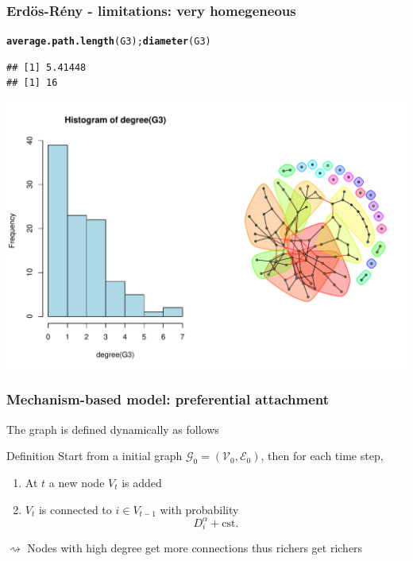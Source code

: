 \documentclass{beamer}\usepackage[]{graphicx}\usepackage[]{color}
\makeatletter
\newcommand{\hlstd}[1]{\textcolor[rgb]{0.345,0.345,0.345}{#1}}%
\newcommand{\hlkwd}[1]{\textcolor[rgb]{0.737,0.353,0.396}{\textbf{#1}}}%
\newenvironment{kframe}{%
 \def\at@end@of@kframe{}%
 \ifinner\ifhmode%
  \def\at@end@of@kframe{\end{minipage}}%
  \begin{minipage}{\columnwidth}%
 \fi\fi%
 \def\FrameCommand##1{\hskip\@totalleftmargin \hskip-\fboxsep
 \colorbox{shadecolor}{##1}\hskip-\fboxsep
     \hskip-\linewidth \hskip-\@totalleftmargin \hskip\columnwidth}%
 \MakeFramed {\advance\hsize-\width
   \@totalleftmargin\z@ \linewidth\hsize
   \@setminipage}}%
 {\par\unskip\endMakeFramed%
 \at@end@of@kframe}
\newenvironment{knitrout}{}{} %
\makeatother
\begin{document}
\begin{frame}[fragile]
  \frametitle{Erdös-Rény - limitations: very homegeneous}

\begin{knitrout}\scriptsize
{}\color{fgcolor}\begin{kframe}
\begin{alltt}
\hlkwd{average.path.length}\hlstd{(G3);} \hlkwd{diameter}\hlstd{(G3)}
\end{alltt}
\begin{verbatim}
## [1] 5.41448
## [1] 16
\end{verbatim}
\end{kframe}
\end{knitrout}

\begin{knitrout}\scriptsize
{}\color{fgcolor}
\includegraphics[width=.8\textwidth]{figures/ER_limitation2-1} 

\end{knitrout}
\end{frame}

\begin{frame}
  \frametitle{Mechanism-based model: preferential attachment}

  The graph is defined dynamically as follows
  \begin{block}{Definition}
    Start from a initial graph $\mathcal{G}_0 = (\mathcal{V}_0,\mathcal{E}_0)$, then for each time step,
    \begin{enumerate}
      \item At $t$ a new node $V_t$ is added
      \item $V_t$ is connected to $i \in V_{t-1}$ with probability
      \begin{equation*}
        D_i^\alpha + \mathrm{cst.}
      \end{equation*}
    \end{enumerate}
  \end{block}
  $\rightsquigarrow$ Nodes with high degree get more connections thus \alert{richers get richers}
\end{frame}
\end{document}
